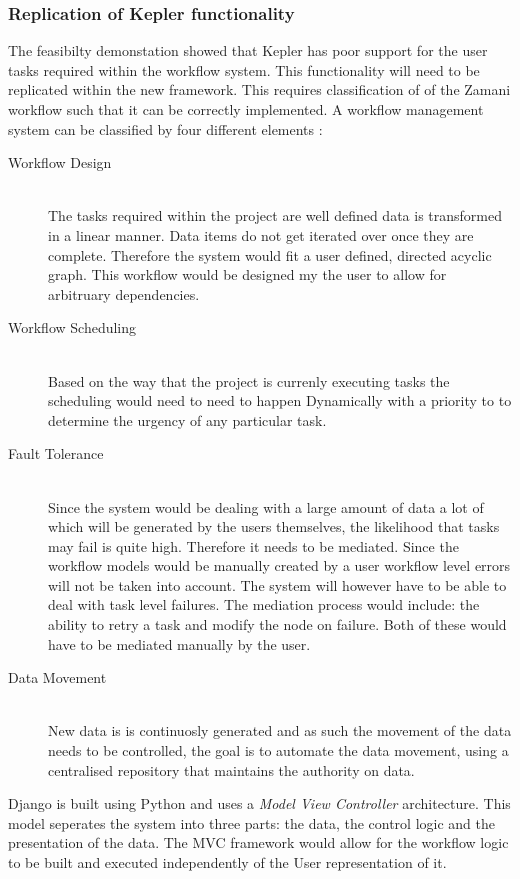 \documentclass[12pt,a4paper]{report}
\begin{document}
\subsubsection{Replication of Kepler functionality}
The feasibilty demonstation showed that Kepler has poor support for the user
tasks required within the workflow system. This functionality will need to
be replicated within the new framework. This requires classification of
of the Zamani workflow such that it can be correctly implemented.
A workflow management system can be classified by four different elements
\cite{yu2005taxonomy}:
\begin{description}
    \item[Workflow Design] \hfill \\
        The tasks required within the project are well defined
        data is transformed in a linear manner. Data items do not get iterated over
        once they are complete. Therefore the system would fit a user defined,
        directed acyclic graph. This workflow would be designed my the user to
        allow for arbitruary dependencies.
    \item[Workflow Scheduling] \hfill \\
        Based on the way that the project is currenly executing tasks the scheduling
        would need to need to happen Dynamically with a priority to to determine the
        urgency of any particular task.
    \item[Fault Tolerance] \hfill \\
        Since the system would be dealing with a large amount of data a lot of which
        will be generated by the users themselves, the likelihood that tasks may fail
        is quite high. Therefore it needs to be mediated. Since the workflow models
        would be manually created by a user workflow level errors will not be taken
        into account. The system will however have to be able to deal with task level
        failures. The mediation process would include: the ability to retry a task
        and modify the node on failure. Both of these would have to be mediated manually
        by the user.
    \item[Data Movement] \hfill \\
        New data is is continuosly generated and as such the movement of the data needs
        to be controlled, the goal is to automate the data movement, using a centralised
        repository that maintains the authority on data.
\end{description}
Django is built using Python and uses a \emph{Model View Controller}
architecture\cite{leff2001web}. This model seperates the system into three parts: the
data, the control logic and the presentation of the data. The MVC framework would allow for
the workflow logic to be built and executed independently of the User representation of it.
\end{document}
